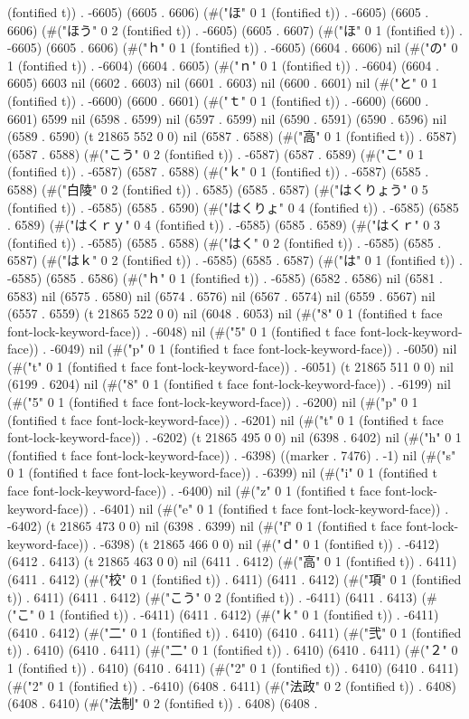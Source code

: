 (fontified t)) . -6605) (6605 . 6606) (#("ほ" 0 1 (fontified t)) . -6605) (6605 . 6606) (#("ほう" 0 2 (fontified t)) . -6605) (6605 . 6607) (#("ほ" 0 1 (fontified t)) . -6605) (6605 . 6606) (#("ｈ" 0 1 (fontified t)) . -6605) (6604 . 6606) nil (#("の" 0 1 (fontified t)) . -6604) (6604 . 6605) (#("ｎ" 0 1 (fontified t)) . -6604) (6604 . 6605) 6603 nil (6602 . 6603) nil (6601 . 6603) nil (6600 . 6601) nil (#("と" 0 1 (fontified t)) . -6600) (6600 . 6601) (#("ｔ" 0 1 (fontified t)) . -6600) (6600 . 6601) 6599 nil (6598 . 6599) nil (6597 . 6599) nil (6590 . 6591) (6590 . 6596) nil (6589 . 6590) (t 21865 552 0 0) nil (6587 . 6588) (#("高" 0 1 (fontified t)) . 6587) (6587 . 6588) (#("こう" 0 2 (fontified t)) . -6587) (6587 . 6589) (#("こ" 0 1 (fontified t)) . -6587) (6587 . 6588) (#("ｋ" 0 1 (fontified t)) . -6587) (6585 . 6588) (#("白陵" 0 2 (fontified t)) . 6585) (6585 . 6587) (#("はくりょう" 0 5 (fontified t)) . -6585) (6585 . 6590) (#("はくりょ" 0 4 (fontified t)) . -6585) (6585 . 6589) (#("はくｒｙ" 0 4 (fontified t)) . -6585) (6585 . 6589) (#("はくｒ" 0 3 (fontified t)) . -6585) (6585 . 6588) (#("はく" 0 2 (fontified t)) . -6585) (6585 . 6587) (#("はｋ" 0 2 (fontified t)) . -6585) (6585 . 6587) (#("は" 0 1 (fontified t)) . -6585) (6585 . 6586) (#("ｈ" 0 1 (fontified t)) . -6585) (6582 . 6586) nil (6581 . 6583) nil (6575 . 6580) nil (6574 . 6576) nil (6567 . 6574) nil (6559 . 6567) nil (6557 . 6559) (t 21865 522 0 0) nil (6048 . 6053) nil (#("8" 0 1 (fontified t face font-lock-keyword-face)) . -6048) nil (#("5" 0 1 (fontified t face font-lock-keyword-face)) . -6049) nil (#("p" 0 1 (fontified t face font-lock-keyword-face)) . -6050) nil (#("t" 0 1 (fontified t face font-lock-keyword-face)) . -6051) (t 21865 511 0 0) nil (6199 . 6204) nil (#("8" 0 1 (fontified t face font-lock-keyword-face)) . -6199) nil (#("5" 0 1 (fontified t face font-lock-keyword-face)) . -6200) nil (#("p" 0 1 (fontified t face font-lock-keyword-face)) . -6201) nil (#("t" 0 1 (fontified t face font-lock-keyword-face)) . -6202) (t 21865 495 0 0) nil (6398 . 6402) nil (#("h" 0 1 (fontified t face font-lock-keyword-face)) . -6398) ((marker . 7476) . -1) nil (#("s" 0 1 (fontified t face font-lock-keyword-face)) . -6399) nil (#("i" 0 1 (fontified t face font-lock-keyword-face)) . -6400) nil (#("z" 0 1 (fontified t face font-lock-keyword-face)) . -6401) nil (#("e" 0 1 (fontified t face font-lock-keyword-face)) . -6402) (t 21865 473 0 0) nil (6398 . 6399) nil (#("f" 0 1 (fontified t face font-lock-keyword-face)) . -6398) (t 21865 466 0 0) nil (#("ｄ" 0 1 (fontified t)) . -6412) (6412 . 6413) (t 21865 463 0 0) nil (6411 . 6412) (#("高" 0 1 (fontified t)) . 6411) (6411 . 6412) (#("校" 0 1 (fontified t)) . 6411) (6411 . 6412) (#("項" 0 1 (fontified t)) . 6411) (6411 . 6412) (#("こう" 0 2 (fontified t)) . -6411) (6411 . 6413) (#("こ" 0 1 (fontified t)) . -6411) (6411 . 6412) (#("ｋ" 0 1 (fontified t)) . -6411) (6410 . 6412) (#("二" 0 1 (fontified t)) . 6410) (6410 . 6411) (#("弐" 0 1 (fontified t)) . 6410) (6410 . 6411) (#("二" 0 1 (fontified t)) . 6410) (6410 . 6411) (#("２" 0 1 (fontified t)) . 6410) (6410 . 6411) (#("2" 0 1 (fontified t)) . 6410) (6410 . 6411) (#("2" 0 1 (fontified t)) . -6410) (6408 . 6411) (#("法政" 0 2 (fontified t)) . 6408) (6408 . 6410) (#("法制" 0 2 (fontified t)) . 6408) (6408 . 